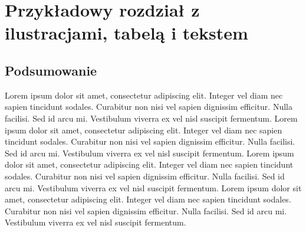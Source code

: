 \chapter{Przykładowy rozdział z ilustracjami, tabelą i tekstem}

\section{Podsumowanie}

Lorem ipsum dolor sit amet, consectetur adipiscing elit. Integer vel diam nec sapien tincidunt sodales. Curabitur non nisi vel sapien dignissim efficitur. Nulla facilisi. Sed id arcu mi. Vestibulum viverra ex vel nisl suscipit fermentum. Lorem ipsum dolor sit amet, consectetur adipiscing elit. Integer vel diam nec sapien tincidunt sodales. Curabitur non nisi vel sapien dignissim efficitur. Nulla facilisi. Sed id arcu mi. Vestibulum viverra ex vel nisl suscipit fermentum. Lorem ipsum dolor sit amet, consectetur adipiscing elit. Integer vel diam nec sapien tincidunt sodales. Curabitur non nisi vel sapien dignissim efficitur. Nulla facilisi. Sed id arcu mi. Vestibulum viverra ex vel nisl suscipit fermentum. Lorem ipsum dolor sit amet, consectetur adipiscing elit. Integer vel diam nec sapien tincidunt sodales. Curabitur non nisi vel sapien dignissim efficitur. Nulla facilisi. Sed id arcu mi. Vestibulum viverra ex vel nisl suscipit fermentum.
